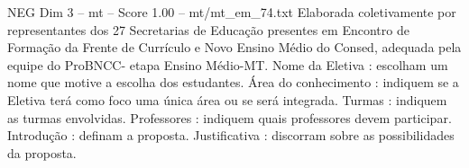 \begin{textsample}{NEG Dim 3 – mt – Score 1.00 – mt/mt\_em\_74.txt}
Elaborada coletivamente por representantes dos 27 Secretarias de Educação presentes em Encontro de Formação da Frente de Currículo e Novo Ensino Médio do Consed, adequada pela equipe do ProBNCC- etapa Ensino Médio-MT.
Nome da Eletiva : escolham um nome que motive a escolha dos estudantes.
Área do conhecimento : indiquem se a Eletiva terá como foco uma única área ou se será integrada.
Turmas : indiquem as turmas envolvidas.
Professores : indiquem quais professores devem participar.
Introdução : definam a proposta.
Justificativa : discorram sobre as possibilidades da proposta.

\end{textsample}
